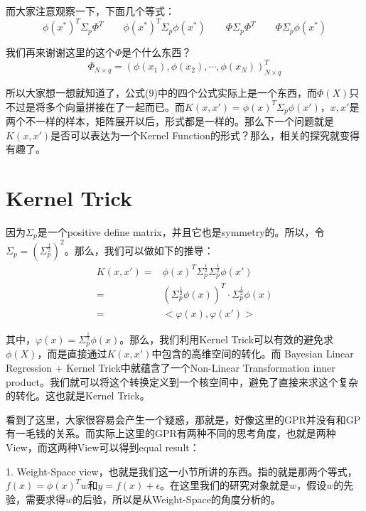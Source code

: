 \documentclass[a4paper]{article}
\begin{document}
而大家注意观察一下，下面几个等式：
\begin{equation}
    \phi(x^\ast)^T\Sigma_p\Phi^T \qquad \phi(x^\ast)^T\Sigma_p\phi(x^\ast) \qquad
    \Phi\Sigma_p\Phi^T \qquad
    \Phi\Sigma_p\phi(x^\ast) 
\end{equation}

我们再来谢谢这里的这个$\Phi$是个什么东西？
\begin{equation}
    \Phi_{N\times q} = (\phi(x_1),\phi(x_2),\cdots,\phi(x_N))^T_{N\times q}
\end{equation}

所以大家想一想就知道了，公式(9)中的四个公式实际上是一个东西，而$\Phi(X)$只不过是将多个向量拼接在了一起而已。而$K(x,x')=\phi(x)^T\Sigma_p\phi(x')$，$x,x'$是两个不一样的样本，矩阵展开以后，形式都是一样的。那么下一个问题就是$K(x,x')$是否可以表达为一个Kernel Function的形式？那么，相关的探究就变得有趣了。

\section{Kernel Trick}
因为$\Sigma_p$是一个positive define matrix，并且它也是symmetry的。所以，令$\Sigma_p = (\Sigma_p^{\frac{1}{2}})^2$。那么，我们可以做如下的推导：
\begin{equation}
    \begin{split}
        K(x,x') 
        = & \phi(x)^T\Sigma_p^{\frac{1}{2}}\Sigma_p^{\frac{1}{2}}\phi(x') \\
        = & (\Sigma_p^{\frac{1}{2}}\phi(x))^T\cdot \Sigma_p^{\frac{1}{2}}\phi(x) \\
        = & <\varphi(x),\varphi(x')>
    \end{split}
\end{equation}

其中，$\varphi(x) = \Sigma_p^{\frac{1}{2}}\phi(x)$。那么，我们利用Kernel Trick可以有效的避免求$\phi(X)$，而是直接通过$K(x,x')$中包含的高维空间的转化。而{\color{red} Bayesian Linear Regression + Kernel Trick中就蕴含了一个Non-Linear Transformation inner product。}我们就可以将这个转换定义到一个核空间中，避免了直接来求这个复杂的转化。这也就是Kernel Trick。

看到了这里，大家很容易会产生一个疑惑，那就是，好像这里的GPR并没有和GP有一毛钱的关系。而实际上这里的GPR有两种不同的思考角度，也就是两种View，而这两种View可以得到equal result：

1. Weight-Space view，也就是我们这一小节所讲的东西。指的就是那两个等式，$f(x) = \phi(x)^Tw$和$y=f(x)+\epsilon$。在这里我们的研究对象就是$w$，假设$w$的先验，需要求得$w$的后验，所以是从Weight-Space的角度分析的。
\end{document}
